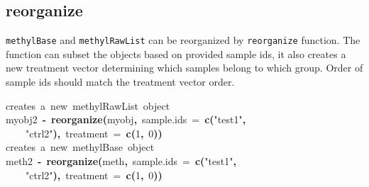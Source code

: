 \documentclass{article}
\makeatletter
\newcommand{\hlnumber}[1]{\textcolor[rgb]{0,0,0}{#1}}%
\newcommand{\hlfunctioncall}[1]{\textcolor[rgb]{.5,0,.33}{\textbf{#1}}}%
\newcommand{\hlstring}[1]{\textcolor[rgb]{.6,.6,1}{#1}}%
\newcommand{\hlkeyword}[1]{\textbf{#1}}%
\newcommand{\hlargument}[1]{\textcolor[rgb]{.69,.25,.02}{#1}}%
\newcommand{\hlcomment}[1]{\textcolor[rgb]{.18,.6,.34}{#1}}%
\newcommand{\hlassignement}[1]{\textbf{#1}}%
\newcommand{\hlsymbol}[1]{#1}%
\newcommand{\hlstd}[1]{\textcolor[rgb]{0,0,0}{#1}}%
\newenvironment{kframe}{%
 \def\FrameCommand##1{\hskip\@totalleftmargin \hskip-\fboxsep
 \colorbox{shadecolor}{##1}\hskip-\fboxsep
     \hskip-\linewidth \hskip-\@totalleftmargin \hskip\columnwidth}%
 \MakeFramed {\advance\hsize-\width
   \@totalleftmargin\z@ \linewidth\hsize
   \@setminipage}}%
 {\par\unskip\endMakeFramed}
\newenvironment{knitrout}{}{} %
\makeatother
\begin{document}
\subsection{reorganize}
\texttt{methylBase} and \texttt{methylRawList} can be reorganized by \texttt{reorganize} function. The function can subset the objects based on provided sample ids, it also creates a new treatment vector determining which samples belong to which group. Order of sample ids should match the treatment vector order.
\begin{knitrout}
\color{fgcolor}\begin{kframe}
\begin{flushleft}
\ttfamily\noindent
\hlcomment{\usebox{\hlnormalsizeboxhash}{\ }creates{\ }a{\ }new{\ }methylRawList{\ }object}\hspace*{\fill}\\
\hlstd{}\hlsymbol{myobj2}{\ }\hlassignement{\usebox{\hlnormalsizeboxlessthan}-}{\ }\hlfunctioncall{reorganize}\hlkeyword{(}\hlsymbol{myobj}\hlkeyword{,}{\ }\hlargument{sample.ids}{\ }\hlargument{=}{\ }\hlfunctioncall{c}\hlkeyword{(}\hlstring{"{}test1"{}}\hlkeyword{,}\hspace*{\fill}\\
\hlstd{}{\ }{\ }{\ }{\ }\hlstring{"{}ctrl2"{}}\hlkeyword{)}\hlkeyword{,}{\ }\hlargument{treatment}{\ }\hlargument{=}{\ }\hlfunctioncall{c}\hlkeyword{(}\hlnumber{1}\hlkeyword{,}{\ }\hlnumber{0}\hlkeyword{)}\hlkeyword{)}\hspace*{\fill}\\
\hlstd{}\hlcomment{\usebox{\hlnormalsizeboxhash}{\ }creates{\ }a{\ }new{\ }methylBase{\ }object}\hspace*{\fill}\\
\hlstd{}\hlsymbol{meth2}{\ }\hlassignement{\usebox{\hlnormalsizeboxlessthan}-}{\ }\hlfunctioncall{reorganize}\hlkeyword{(}\hlsymbol{meth}\hlkeyword{,}{\ }\hlargument{sample.ids}{\ }\hlargument{=}{\ }\hlfunctioncall{c}\hlkeyword{(}\hlstring{"{}test1"{}}\hlkeyword{,}\hspace*{\fill}\\
\hlstd{}{\ }{\ }{\ }{\ }\hlstring{"{}ctrl2"{}}\hlkeyword{)}\hlkeyword{,}{\ }\hlargument{treatment}{\ }\hlargument{=}{\ }\hlfunctioncall{c}\hlkeyword{(}\hlnumber{1}\hlkeyword{,}{\ }\hlnumber{0}\hlkeyword{)}\hlkeyword{)}\mbox{}
\normalfont
\end{flushleft}
\end{kframe}
\end{knitrout}
\end{document}
